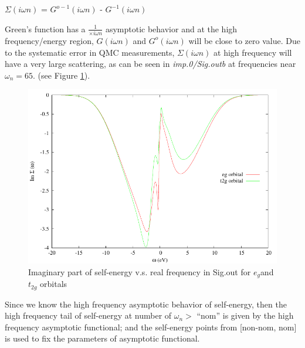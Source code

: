 \documentclass[12 pt]{article}
\begin{document}
\begin{itemize}[leftmargin=0.2in]
\begin{itemize}[leftmargin=0.5in]
  $\Sigma(i\omega n)$ = $G^{o -1}(i\omega n)$ - $G^{-1}(i\omega n)$

  Green's function has a $\frac{1}{×i\omega n}$ asymptotic behavior and at the high frequency/energy region, 
$G(i\omega n)$ and $G^o(i\omega n)$ will be close to zero value. Due to the systematic error in QMC measurements, 
$\Sigma(i\omega n)$ at high frequency will have a very large scattering, as can be seen in \emph{imp.0/Sig.outb} at 
frequencies near $\omega_n = 65$. 
(see Figure \ref{Imaginary part of self-energy v.s. real frequency in Sig.out for eg and t2g orbitals}). 

  \begin{figure}[ht]
    \centering
    \captionsetup{justification=centering}
    \caption{Imaginary part of self-energy v.s. real frequency in Sig.out for $e_g$and $t_{2g}$ orbitals}
    \label{Imaginary part of self-energy v.s. real frequency in Sig.out for eg and t2g orbitals}
    \vspace{2ex}
    \includegraphics[scale=1.3]{gnuplotImaginaryPartRealFrequency}
  \end{figure}

  Since we know the high frequency asymptotic behavior of self-energy, then the high frequency tail of self-energy at 
number of $\omega_n >$ ``nom'' is given by the high frequency asymptotic functional; and the self-energy points 
from [non-nom, nom] is used to fix the parameters of asymptotic functional. 

		  \end{itemize} 

	      \end{itemize}
\end{document}
